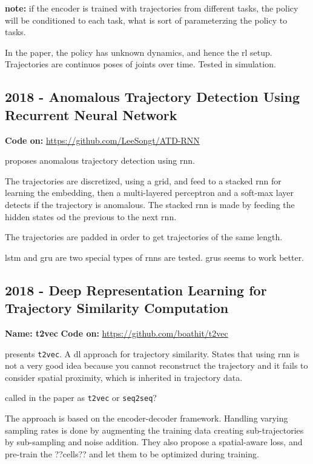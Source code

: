 \textbf{note:} if the encoder is trained with trajectories from different tasks, the policy will be conditioned to each task, what is sort of parameterzing the policy to tasks. 

In the paper, the policy has unknown dynamics, and hence the \gls{rl} setup. Trajectories are continuos poses of joints over time. Tested in simulation. 

\subsection*{2018 - Anomalous Trajectory Detection Using Recurrent Neural Network}

\textbf{Code on:} \url{https://github.com/LeeSongt/ATD-RNN}

\cite{song2018anomalous} proposes anomalous trajectory detection using \gls{rnn}.

The trajectories are discretized, using a grid, and feed to a stacked \gls{rnn} for learning the embedding, then a multi-layered perceptron and a soft-max layer detects if the trajectory is anomalous.
%
The stacked \gls{rnn} is made by feeding the hidden states od the previous to the next \gls{rnn}.

The trajectories are padded in order to get trajectories of the same length.

\gls{lstm} and \gls{gru} are two special types of \glspl{rnn} are tested. \glspl{gru} seems to work better.

\subsection*{2018 - Deep Representation Learning for Trajectory Similarity Computation}

\textbf{Name: t2vec}
\textbf{Code on:} \url{https://github.com/boathit/t2vec}

\cite{li2018deep} presents \texttt{t2vec}. A \gls{dl} approach for trajectory similarity. States that using \gls{rnn} is not a very good idea because you cannot reconstruct the trajectory and it fails to consider spatial proximity, which is inherited in trajectory data.

called in the paper as \texttt{t2vec} or \texttt{seq2seq}?

The approach is based on the encoder-decoder framework.
%
Handling varying sampling rates is done by augmenting the training data creating sub-trajectories by sub-sampling and noise addition. They also propose a spatial-aware loss, and pre-train the ??cells?? and let them to be optimized during training.

